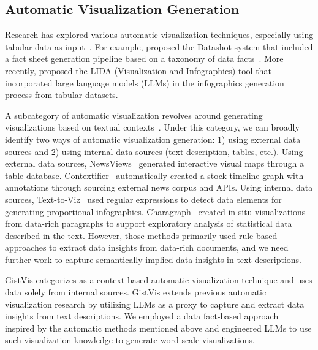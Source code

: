 \vspace*{-2pt}
\subsection{Automatic Visualization Generation}
Research has explored various automatic visualization techniques, especially using tabular data as input~\cite{wang2020datashot, shi2021calliope, dibia2023lida}. For example, \citet{wang2020datashot} proposed the Datashot system that included a fact sheet generation pipeline based on a taxonomy of data facts~\cite{chen2009effective}. %
More recently, \citet{dibia2023lida} proposed the LIDA (Visua\underline{li}zation an\underline{d} Infogr\underline{a}phics) tool that incorporated large language models (LLMs) in the infographics generation process from tabular datasets. 


A subcategory of automatic visualization revolves around generating visualizations based on textual contexts~\cite{wu2022ai4vis}. Under this category, we can broadly identify two ways of automatic visualization generation:
1) using external data sources and 2) using internal data sources (text description, tables, etc.). Using external data sources, NewsViews~\cite{gao2014newsviews} generated interactive visual maps through a table database. Contextifier~\cite{hullman2013contextifier} automatically created a stock timeline graph with annotations through sourcing external news corpus and APIs. Using internal data sources, Text-to-Viz~\cite{cui2020texttoviz} used regular expressions to detect data elements for generating proportional infographics. Charagraph~\cite{masson2023Charagraph} created in situ visualizations from data-rich paragraphs to support exploratory analysis of statistical data described in the text. However, those methods primarily used rule-based approaches to extract data insights from data-rich documents, and we need further work to capture semantically implied data insights in text descriptions.

GistVis categorizes as a context-based automatic visualization technique and uses data solely from internal sources. GistVis extends previous automatic visualization research by utilizing LLMs as a proxy to capture and extract data insights from text descriptions.
We employed a data fact-based approach~\cite{chen2009effective} inspired by the automatic methods mentioned above and engineered LLMs to use such visualization knowledge to generate word-scale visualizations.

\vspace*{-2pt}
